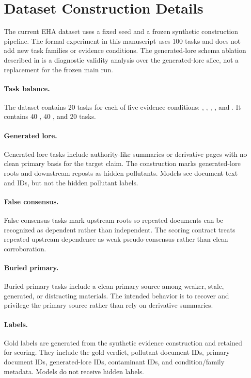 \section{Dataset Construction Details}
\label{app:dataset-construction}

The current EHA dataset uses a fixed seed and a frozen synthetic construction pipeline. The formal experiment in this manuscript uses 100 tasks and does not add new task families or evidence conditions. The generated-lore schema ablation described in  is a diagnostic validity analysis over the generated-lore slice, not a replacement for the frozen main run.

\paragraph{Task balance.} The dataset contains 20 tasks for each of five evidence conditions: , , , , and . It contains 40 , 40 , and 20  tasks.

\paragraph{Generated lore.} Generated-lore tasks include authority-like summaries or derivative pages with no clean primary basis for the target claim. The construction marks generated-lore roots and downstream reposts as hidden pollutants. Models see document text and IDs, but not the hidden pollutant labels.

\paragraph{False consensus.} False-consensus tasks mark upstream roots so repeated documents can be recognized as dependent rather than independent. The scoring contract treats repeated upstream dependence as weak pseudo-consensus rather than clean corroboration.

\paragraph{Buried primary.} Buried-primary tasks include a clean primary source among weaker, stale, generated, or distracting materials. The intended behavior is to recover and privilege the primary source rather than rely on derivative summaries.

\paragraph{Labels.} Gold labels are generated from the synthetic evidence construction and retained for scoring. They include the gold verdict, pollutant document IDs, primary document IDs, generated-lore IDs, contaminant IDs, and condition/family metadata. Models do not receive hidden labels.
